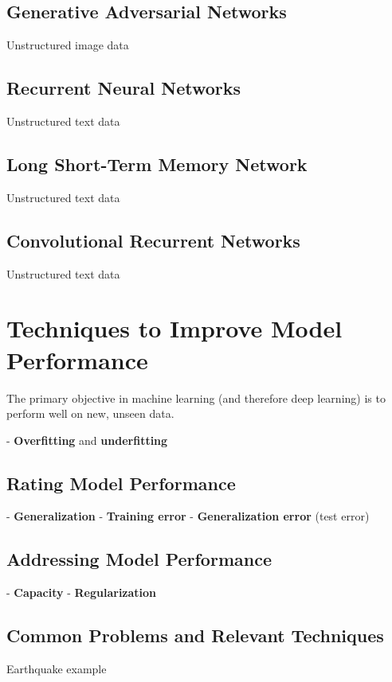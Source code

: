 \subsection{Generative Adversarial Networks}
Unstructured image data

\subsection{Recurrent Neural Networks}
Unstructured text data

\subsection{Long Short-Term Memory Network}
Unstructured text data

\subsection{Convolutional Recurrent Networks}
Unstructured text data

\section{Techniques to Improve Model Performance} %

The primary objective in machine learning (and therefore deep learning) is to perform well on new, unseen data. 

- \textbf{Overfitting} and \textbf{underfitting}

\subsection{Rating Model Performance}
- \textbf{Generalization}
- \textbf{Training error}  
- \textbf{Generalization error} (test error)

\subsection{Addressing Model Performance}
- \textbf{Capacity}
- \textbf{Regularization}

\subsection{Common Problems and Relevant Techniques}

Earthquake example